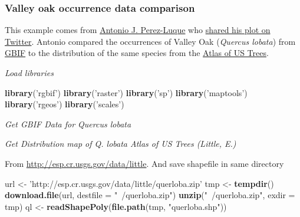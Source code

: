 \documentclass[author-year, review, 11pt]{components/elsarticle} %
\newenvironment{Shaded}{\begin{snugshade}}{\end{snugshade}}
\newcommand{\KeywordTok}[1]{\textcolor[rgb]{0.13,0.29,0.53}{\textbf{{#1}}}}
\newcommand{\DataTypeTok}[1]{\textcolor[rgb]{0.13,0.29,0.53}{{#1}}}
\newcommand{\DecValTok}[1]{\textcolor[rgb]{0.00,0.00,0.81}{{#1}}}
\newcommand{\StringTok}[1]{\textcolor[rgb]{0.31,0.60,0.02}{{#1}}}
\newcommand{\NormalTok}[1]{{#1}}
\begin{document}
\subsubsection{Valley oak occurrence data
comparison}\label{valley-oak-occurrence-data-comparison}

This example comes from \href{https://twitter.com/ajpelu}{Antonio J.
Perez-Luque} who
\href{https://twitter.com/ajpelu/status/473951167567757312}{shared his
plot on Twitter}. Antonio compared the occurrences of Valley Oak
(\emph{Quercus lobata}) from \href{http://www.gbif.org/}{GBIF} to the
distribution of the same species from the
\href{http://esp.cr.usgs.gov/data/little/}{Atlas of US Trees}.

\emph{Load libraries}

\begin{Shaded}
\begin{Highlighting}[]
\KeywordTok{library}\NormalTok{(}\StringTok{'rgbif'}\NormalTok{)}
\KeywordTok{library}\NormalTok{(}\StringTok{'raster'}\NormalTok{)}
\KeywordTok{library}\NormalTok{(}\StringTok{'sp'}\NormalTok{)}
\KeywordTok{library}\NormalTok{(}\StringTok{'maptools'}\NormalTok{)}
\KeywordTok{library}\NormalTok{(}\StringTok{'rgeos'}\NormalTok{)}
\KeywordTok{library}\NormalTok{(}\StringTok{'scales'}\NormalTok{)}
\end{Highlighting}
\end{Shaded}

\emph{Get GBIF Data for Quercus lobata}

\begin{Shaded}
\end{Shaded}

\emph{Get Distribution map of Q. lobata Atlas of US Trees (Little, E.)}

From \url{http://esp.cr.usgs.gov/data/little}. And save shapefile in
same directory

\begin{Shaded}
\begin{Highlighting}[]
\NormalTok{url <-}\StringTok{ 'http://esp.cr.usgs.gov/data/little/querloba.zip'}
\NormalTok{tmp <-}\StringTok{ }\KeywordTok{tempdir}\NormalTok{()}
\KeywordTok{download.file}\NormalTok{(url, }\DataTypeTok{destfile =} \StringTok{"~/querloba.zip"}\NormalTok{)}
\KeywordTok{unzip}\NormalTok{(}\StringTok{"~/querloba.zip"}\NormalTok{, }\DataTypeTok{exdir =} \NormalTok{tmp)}
\NormalTok{ql <-}\StringTok{ }\KeywordTok{readShapePoly}\NormalTok{(}\KeywordTok{file.path}\NormalTok{(tmp, }\StringTok{"querloba.shp"}\NormalTok{))}
\end{Highlighting}
\end{Shaded}
\end{document}
